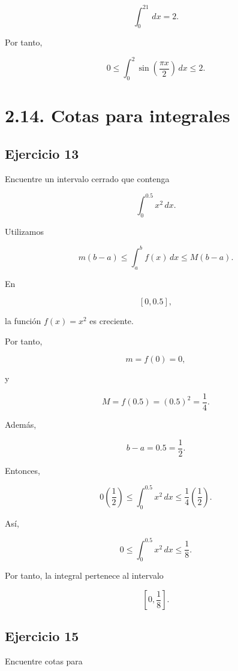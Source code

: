 \documentclass[12pt]{article}
\begin{document}
\[
\int_0^21\,dx=2.
\]

Por tanto,

\[
\boxed{
0
\leq
\int_0^2
\sin\left(\frac{\pi x}{2}\right)\,dx
\leq2
}.
\]

\section*{2.14. Cotas para integrales}

\subsection*{Ejercicio 13}

Encuentre un intervalo cerrado que contenga

\[
\int_0^{0.5}x^2\,dx.
\]

Utilizamos

\[
m(b-a)
\leq
\int_a^bf(x)\,dx
\leq
M(b-a).
\]

En

\[
[0,0.5],
\]

la función \(f(x)=x^2\) es creciente.

Por tanto,

\[
m=f(0)=0,
\]

y

\[
M=f(0.5)=(0.5)^2=\frac14.
\]

Además,

\[
b-a=0.5=\frac12.
\]

Entonces,

\[
0\left(\frac12\right)
\leq
\int_0^{0.5}x^2\,dx
\leq
\frac14\left(\frac12\right).
\]

Así,

\[
\boxed{
0
\leq
\int_0^{0.5}x^2\,dx
\leq
\frac18
}.
\]

Por tanto, la integral pertenece al intervalo

\[
\boxed{
\left[0,\frac18\right]
}.
\]

\subsection*{Ejercicio 15}

Encuentre cotas para
\end{document}
